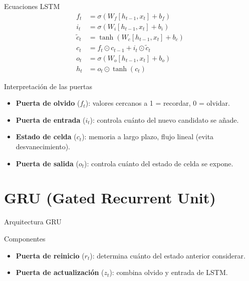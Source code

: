 \documentclass[aspectratio=169, 10pt, xcolor=table]{beamer}
\begin{document}
\begin{frame}{Ecuaciones LSTM}
    \begin{align*}
        f_t &= \sigma(W_f [h_{t-1}, x_t] + b_f) \\
        i_t &= \sigma(W_i [h_{t-1}, x_t] + b_i) \\
        \tilde{c}_t &= \tanh(W_c [h_{t-1}, x_t] + b_c) \\
        c_t &= f_t \odot c_{t-1} + i_t \odot \tilde{c}_t \\
        o_t &= \sigma(W_o [h_{t-1}, x_t] + b_o) \\
        h_t &= o_t \odot \tanh(c_t)
    \end{align*}
\end{frame}

\begin{frame}{Interpretación de las puertas}
    \begin{itemize}
        \item \textbf{Puerta de olvido} ($f_t$): valores cercanos a 1 = recordar, 0 = olvidar.
        \item \textbf{Puerta de entrada} ($i_t$): controla cuánto del nuevo candidato se añade.
        \item \textbf{Estado de celda} ($c_t$): memoria a largo plazo, flujo lineal (evita desvanecimiento).
        \item \textbf{Puerta de salida} ($o_t$): controla cuánto del estado de celda se expone.
    \end{itemize}
\end{frame}

\section{GRU (Gated Recurrent Unit)}

\begin{frame}{Arquitectura GRU}
    \begin{block}{Componentes}
        \begin{itemize}
            \item \textbf{Puerta de reinicio} ($r_t$): determina cuánto del estado anterior considerar.
            \item \textbf{Puerta de actualización} ($z_t$): combina olvido y entrada de LSTM.
        \end{itemize}
    \end{block}
\end{frame}
\end{document}
